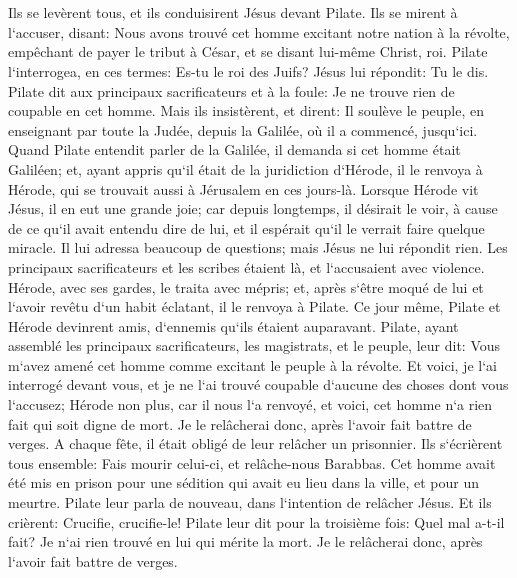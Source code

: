 \chapter{}

\verse Ils se levèrent tous, et ils conduisirent Jésus devant Pilate. 
\verse Ils se mirent à l`accuser, disant: Nous avons trouvé cet homme excitant notre nation à la révolte, empêchant de payer le tribut à César, et se disant lui-même Christ, roi. 
\verse Pilate l`interrogea, en ces termes: Es-tu le roi des Juifs? Jésus lui répondit: Tu le dis. 
\verse Pilate dit aux principaux sacrificateurs et à la foule: Je ne trouve rien de coupable en cet homme. 
\verse Mais ils insistèrent, et dirent: Il soulève le peuple, en enseignant par toute la Judée, depuis la Galilée, où il a commencé, jusqu`ici. 
\verse Quand Pilate entendit parler de la Galilée, il demanda si cet homme était Galiléen; 
\verse et, ayant appris qu`il était de la juridiction d`Hérode, il le renvoya à Hérode, qui se trouvait aussi à Jérusalem en ces jours-là. 
\verse Lorsque Hérode vit Jésus, il en eut une grande joie; car depuis longtemps, il désirait le voir, à cause de ce qu`il avait entendu dire de lui, et il espérait qu`il le verrait faire quelque miracle. 
\verse Il lui adressa beaucoup de questions; mais Jésus ne lui répondit rien. 
\verse Les principaux sacrificateurs et les scribes étaient là, et l`accusaient avec violence. 
\verse Hérode, avec ses gardes, le traita avec mépris; et, après s`être moqué de lui et l`avoir revêtu d`un habit éclatant, il le renvoya à Pilate. 
\verse Ce jour même, Pilate et Hérode devinrent amis, d`ennemis qu`ils étaient auparavant. 
\verse Pilate, ayant assemblé les principaux sacrificateurs, les magistrats, et le peuple, leur dit: 
\verse Vous m`avez amené cet homme comme excitant le peuple à la révolte. Et voici, je l`ai interrogé devant vous, et je ne l`ai trouvé coupable d`aucune des choses dont vous l`accusez; 
\verse Hérode non plus, car il nous l`a renvoyé, et voici, cet homme n`a rien fait qui soit digne de mort. 
\verse Je le relâcherai donc, après l`avoir fait battre de verges. 
\verse A chaque fête, il était obligé de leur relâcher un prisonnier. 
\verse Ils s`écrièrent tous ensemble: Fais mourir celui-ci, et relâche-nous Barabbas. 
\verse Cet homme avait été mis en prison pour une sédition qui avait eu lieu dans la ville, et pour un meurtre. 
\verse Pilate leur parla de nouveau, dans l`intention de relâcher Jésus. 
\verse Et ils crièrent: Crucifie, crucifie-le! 
\verse Pilate leur dit pour la troisième fois: Quel mal a-t-il fait? Je n`ai rien trouvé en lui qui mérite la mort. Je le relâcherai donc, après l`avoir fait battre de verges. 
